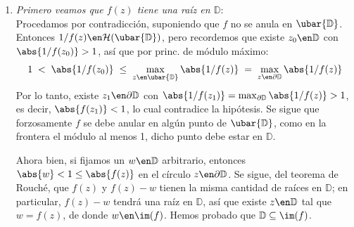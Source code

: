 \begin{sol}
\begin{enumerate}[label=(\alph*),leftmargin=1.5em]
\item
\emph{Primero veamos que $f(z)$ tiene una raíz en $\mathbb{D}$}:\\
Procedamos por contradicción, suponiendo que $f$ no se anula en $\ubar{\mathbb{D}}$. Entonces $1/f(z) \en \mathcal{H}(\ubar{\mathbb{D}})$, pero recordemos que existe $z_0\en\mathbb{D}$ con $\abs{1/f(z_0)}>1$, así que por princ. de módulo máximo:
\[
1 
\;<\; \abs{1/f(z_0)}
\;\le\; \max_{z\en\ubar{\mathbb{D}}} \abs{1/f(z)}
\;=\; \max_{z\en\partial\mathbb{D}} \abs{1/f(z)}
\]
Por lo tanto, existe $z_1\en\partial\mathbb{D}$ con $\abs{1/f(z_1)} = \max_{\partial\mathbb{D}} \abs{1/f(z)} > 1$, es decir, $\abs{f(z_1)} < 1$, lo cual contradice la hipótesis. Se sigue que forzosamente $f$ se debe anular en algún punto de $\ubar{\mathbb{D}}$, como en la frontera el módulo al menos 1, dicho punto debe estar en $\mathbb{D}$.\par
Ahora bien, si fijamos un $w\en\mathbb{D}$ arbitrario, entonces $\abs{w} < 1 \le \abs{f(z)}$ en el círculo $z\en\partial\mathbb{D}$. Se sigue, del teorema de Rouché, que $f(z)$ y $f(z) - w$ tienen la misma cantidad de raíces en $\mathbb{D}$; en particular, $f(z) - w$ tendrá una raíz en $\mathbb{D}$, así que existe $z\en\mathbb{D}$ tal que $w = f(z) $, de donde $w\en\im(f)$. Hemos probado que $\mathbb{D} \subseteq \im(f)$.
\end{enumerate}
\end{sol}